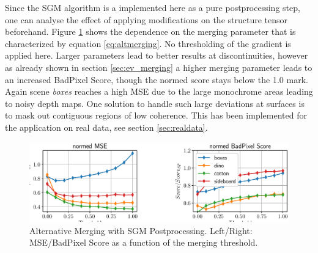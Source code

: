 \documentclass  [
  paper    = a4,
  BCOR     = 10mm,
  twoside,
  fontsize = 12pt,
  fleqn,
  toc      = bibnumbered,
  toc      = listofnumbered,
  numbers  = noendperiod,
  headings = normal,
  listof   = leveldown,
  version  = 3.03
]                                       {scrreprt}
\begin{document}
Since the SGM algorithm is a implemented here as a pure postprocessing step, one can analyse the effect of applying modifications on the structure tensor beforehand. Figure \ref{fig:chooselowersgmppr} shows the dependence on the merging parameter that is characterized by equation \ref{eq:altmerging}. No thresholding of the gradient is applied here. Larger parameters lead to better results at discontinuities, however as already shown in section \ref{sec:ev_merging} a higher merging parameter leads to an increased BadPixel Score, though the normed score stays below the 1.0 mark. Again scene \textit{boxes} reaches a high MSE due to the large monochrome areas leading to noisy depth maps. One solution to handle such large deviations at surfaces is to mask out contiguous regions of low coherence. This has been implemented for the application on real data, see section \ref{sec:realdata}.\\
\begin{figure}
	\centering
	\includegraphics[width=1\linewidth]{images/choose_lower_sgm_ppr}
	\caption[Alternative Merging with SGM Postprocessing]{Alternative Merging with SGM Postprocessing. Left/Right: MSE/BadPixel Score as a function of the merging threshold.}
	\label{fig:chooselowersgmppr}
\end{figure}
\end{document}
